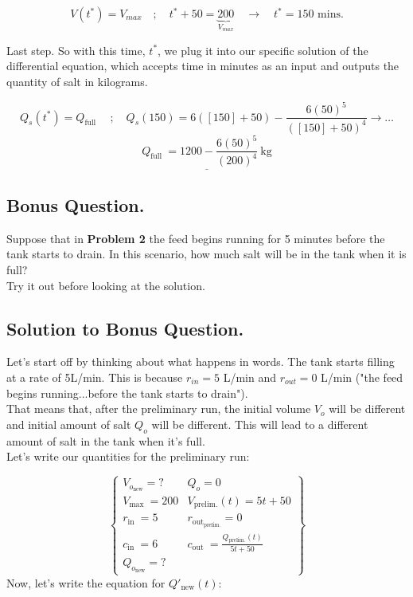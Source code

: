 \documentclass[a4paper,12pt]{article}
\begin{document}
$$ V\left(t^*\right)=V_{max} \quad ; \quad t^*+50=\underbrace{200}_{V_{max}} \quad \rightarrow \quad t^*=150 \text { mins} . $$

Last step. So with this time, $t^*$, we plug it into our specific solution of the differential equation, which accepts time in minutes as an input and outputs the quantity of salt in kilograms.

$$
Q_s\left(t^*\right)=Q_{\text {full }} \quad; \quad Q_s(150)=6([150]+50)-\frac{6(50)^5}{([150]+50)^4} \rightarrow \ldots$$
$$
\underline{\boxed{Q_{\text {full }}=1200-\frac{6(50)^5}{(200)^4} \mathrm{~kg}}} $$

\pagebreak 

\subsection*{Bonus Question.}
Suppose that in \textbf{Problem 2} the feed begins running for 5 minutes before the tank starts to drain. In this scenario, how much salt will be in the tank when it is full?\\

Try it out before looking at the solution.

\pagebreak

\subsection*{Solution to Bonus Question.}

Let's start off by thinking about what happens in words. The tank starts filling at a rate of 5L/min. This is because $r_{in} = 5$ L/min and $r_{out} = 0$ L/min ("the feed begins running...before the tank starts to drain").\\

That means that, after the preliminary run, the initial volume $V_o$ will be different and initial amount of salt $Q_o$ will be different. This will lead to a different amount of salt in the tank when it's full.\\

Let's write our quantities for the preliminary run:

$$
\left\{
\begin{array}{ll}
V_{o_{\text{new}}}=? & Q_o=0 \\
V_{\text {max }}=200 & V_{\text{prelim.}}(t)=5t+50 \\
r_{\text {in }}=5 & r_{\text {out}_{\text{prelim.}}}=0 \\
c_{\text {in }}=6 & c_{\text {out }}=\frac{Q_{\text{prelim.}}(t)}{5t+50}\\
Q_{o_{\text{new}}}=?
\end{array}
\right\}
$$
Now, let's write the equation for $Q'_{\text{new}}(t)$:
\end{document}
